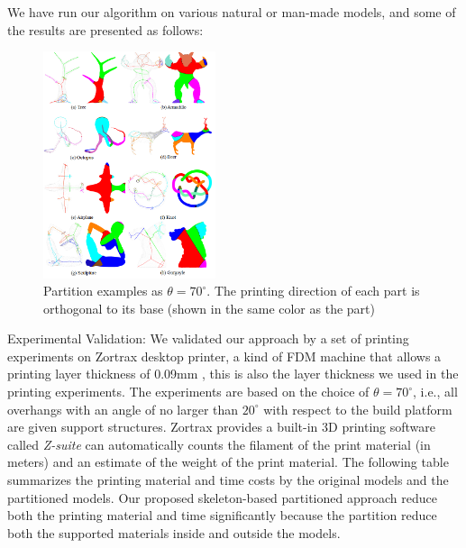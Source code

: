 We have run our algorithm on various natural or man-made models, and some of the results are presented as follows:

\begin{figure}[tbp]
  \centering
  \includegraphics[width=0.45\textwidth]{figs/programming.png}
  \caption{\label{fig:programming}%
           Partition examples as $\theta = 70^{\circ}$. The printing direction of each part is orthogonal to its base (shown in the same color as the part)}
\end{figure}

Experimental Validation: We validated our approach by a set of printing experiments on Zortrax desktop printer, a kind of FDM machine that allows a printing layer thickness of 0.09mm , this is also the layer thickness we used in the printing experiments. The experiments are based on the choice of $\theta = 70^{\circ}$, i.e., all overhangs with an angle of no larger than $20^{\circ}$ with respect to the build platform are given support structures. Zortrax provides a built-in 3D printing software called \emph{Z-suite} can automatically counts the filament of the print material (in meters) and an estimate of the weight of the print material. The following table summarizes the printing material and time costs by the original models and the partitioned models. Our proposed skeleton-based partitioned approach reduce both the printing material and time significantly because the partition reduce both the supported materials inside and outside the models.


